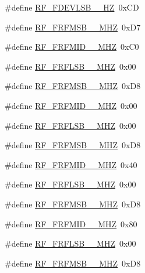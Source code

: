 \begin{DoxyCompactItemize}
\item 
\#define \mbox{\hyperlink{sx1276_regs-_fsk_8h_a1f18878e3fdfb4aa5770666f80fe0cac}{R\+F\+\_\+\+F\+D\+E\+V\+L\+S\+B\+\_\+\_\+\+HZ}}~0x\+CD
\item 
\#define \mbox{\hyperlink{sx1276_regs-_fsk_8h_a7c04c2dc8d6dcc63877be6ab7e60376f}{R\+F\+\_\+\+F\+R\+F\+M\+S\+B\+\_\+\_\+\+M\+HZ}}~0x\+D7
\item 
\#define \mbox{\hyperlink{sx1276_regs-_fsk_8h_a5e338d308b8d245fcadd0c54b17f2164}{R\+F\+\_\+\+F\+R\+F\+M\+I\+D\+\_\+\_\+\+M\+HZ}}~0x\+C0
\item 
\#define \mbox{\hyperlink{sx1276_regs-_fsk_8h_aecfa3c2f5b34cd5f809bbf1e10e467d4}{R\+F\+\_\+\+F\+R\+F\+L\+S\+B\+\_\+\_\+\+M\+HZ}}~0x00
\item 
\#define \mbox{\hyperlink{sx1276_regs-_fsk_8h_a67e8381b0688a6cedc0a9809e841b1bc}{R\+F\+\_\+\+F\+R\+F\+M\+S\+B\+\_\+\_\+\+M\+HZ}}~0x\+D8
\item 
\#define \mbox{\hyperlink{sx1276_regs-_fsk_8h_a012de711e32ef9690d9a2af46ffbb5eb}{R\+F\+\_\+\+F\+R\+F\+M\+I\+D\+\_\+\_\+\+M\+HZ}}~0x00
\item 
\#define \mbox{\hyperlink{sx1276_regs-_fsk_8h_aa2fb137b9b0807073842bddad9257e56}{R\+F\+\_\+\+F\+R\+F\+L\+S\+B\+\_\+\_\+\+M\+HZ}}~0x00
\item 
\#define \mbox{\hyperlink{sx1276_regs-_fsk_8h_a4789261c437ac2f175c6ec70f67018c4}{R\+F\+\_\+\+F\+R\+F\+M\+S\+B\+\_\+\_\+\+M\+HZ}}~0x\+D8
\item 
\#define \mbox{\hyperlink{sx1276_regs-_fsk_8h_a95dd5d402da457617be796822d2cc015}{R\+F\+\_\+\+F\+R\+F\+M\+I\+D\+\_\+\_\+\+M\+HZ}}~0x40
\item 
\#define \mbox{\hyperlink{sx1276_regs-_fsk_8h_a7efd19de747f0506749b11e4f95401e9}{R\+F\+\_\+\+F\+R\+F\+L\+S\+B\+\_\+\_\+\+M\+HZ}}~0x00
\item 
\#define \mbox{\hyperlink{sx1276_regs-_fsk_8h_aa17560da4e17ee817c1bb624e8267a54}{R\+F\+\_\+\+F\+R\+F\+M\+S\+B\+\_\+\_\+\+M\+HZ}}~0x\+D8
\item 
\#define \mbox{\hyperlink{sx1276_regs-_fsk_8h_ab841e5262361314bd63eaa7b4bcb9218}{R\+F\+\_\+\+F\+R\+F\+M\+I\+D\+\_\+\_\+\+M\+HZ}}~0x80
\item 
\#define \mbox{\hyperlink{sx1276_regs-_fsk_8h_a5fa819f17598b9e573c36d6e780b3fb6}{R\+F\+\_\+\+F\+R\+F\+L\+S\+B\+\_\+\_\+\+M\+HZ}}~0x00
\item 
\#define \mbox{\hyperlink{sx1276_regs-_fsk_8h_a1fd84bcd8872d01855cba3d13fe3bc32}{R\+F\+\_\+\+F\+R\+F\+M\+S\+B\+\_\+\_\+\+M\+HZ}}~0x\+D8

\end{DoxyCompactItemize}
